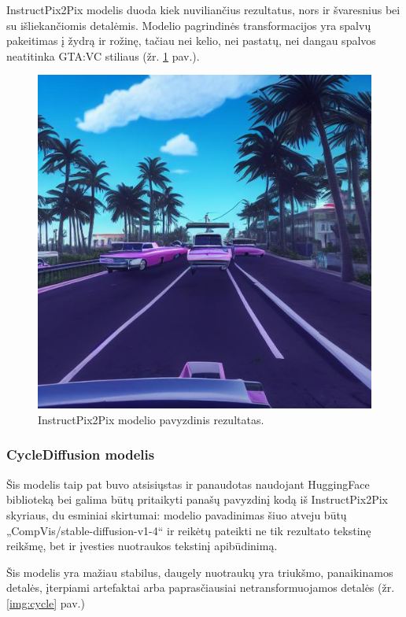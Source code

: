 \documentclass{VUMIFPSbakalaurinis}
\begin{document}
            InstructPix2Pix modelis duoda kiek nuviliančius rezultatus, nors ir švaresnius bei su išliekančiomis detalėmis. Modelio pagrindinės transformacijos yra spalvų pakeitimas į žydrą ir rožinę, tačiau nei kelio, nei pastatų, nei dangau spalvos neatitinka GTA:VC stiliaus (žr. \ref{img:instruct} pav.). 

            \begin{figure}[H]
                \centering
                \includegraphics[scale=0.7]{img/diffusion/instruct/512}
                \caption{InstructPix2Pix modelio pavyzdinis rezultatas.}
                \label{img:instruct}
            \end{figure}

        \subsubsection{CycleDiffusion modelis}
            Šis modelis taip pat buvo atsisiųstas ir panaudotas naudojant HuggingFace biblioteką bei galima būtų pritaikyti panašų pavyzdinį kodą iš InstructPix2Pix skyriaus, du esminiai skirtumai: modelio pavadinimas šiuo atveju būtų „CompVis/stable-diffusion-v1-4“ ir reikėtų pateikti ne tik rezultato tekstinę reikšmę, bet ir įvesties nuotraukos tekstinį apibūdinimą.

            Šis modelis yra mažiau stabilus, daugely nuotraukų yra triukšmo, panaikinamos detalės, įterpiami artefaktai arba paprasčiausiai netransformuojamos detalės (žr. \ref{img:cycle} pav.)
\end{document}
